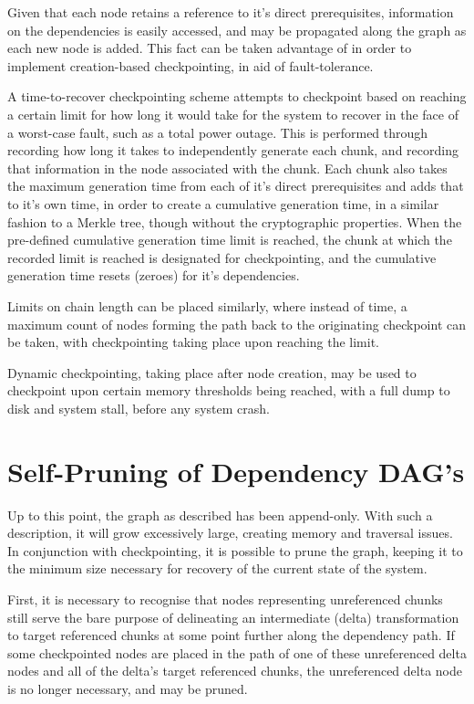 \documentclass[10pt, a4paper]{article}
\begin{document}
Given that each node retains a reference to it's direct prerequisites, information on the dependencies is easily accessed, and may be propagated along the graph as each new node is added.
This fact can be taken advantage of in order to implement creation-based checkpointing, in aid of fault-tolerance.

A time-to-recover checkpointing scheme attempts to checkpoint based on reaching a certain limit for how long it would take for the system to recover in the face of a worst-case fault, such as a total power outage.
This is performed through recording how long it takes to independently generate each chunk, and recording that information in the node associated with the chunk.
Each chunk also takes the maximum generation time from each of it's direct prerequisites and adds that to it's own time, in order to create a cumulative generation time, in a similar fashion to a Merkle tree, though without the cryptographic properties.
When the pre-defined cumulative generation time limit is reached, the chunk at which the recorded limit is reached is designated for checkpointing, and the cumulative generation time resets (zeroes) for it's dependencies.

Limits on chain length can be placed similarly, where instead of time, a maximum count of nodes forming the path back to the originating checkpoint can be taken, with checkpointing taking place upon reaching the limit.

Dynamic checkpointing, taking place after node creation, may be used to checkpoint upon certain memory thresholds being reached, with a full dump to disk and system stall, before any system crash.

\section{Self-Pruning of Dependency DAG's}

Up to this point, the graph as described has been append-only.
With such a description, it will grow excessively large, creating memory and traversal issues.
In conjunction with checkpointing, it is possible to prune the graph, keeping it to the minimum size necessary for recovery of the current state of the system.

First, it is necessary to recognise that nodes representing unreferenced chunks still serve the bare purpose of delineating an intermediate (delta) transformation to target referenced chunks at some point further along the dependency path.
If some checkpointed nodes are placed in the path of one of these unreferenced delta nodes and all of the delta's target referenced chunks, the unreferenced delta node is no longer necessary, and may be pruned.
\end{document}
